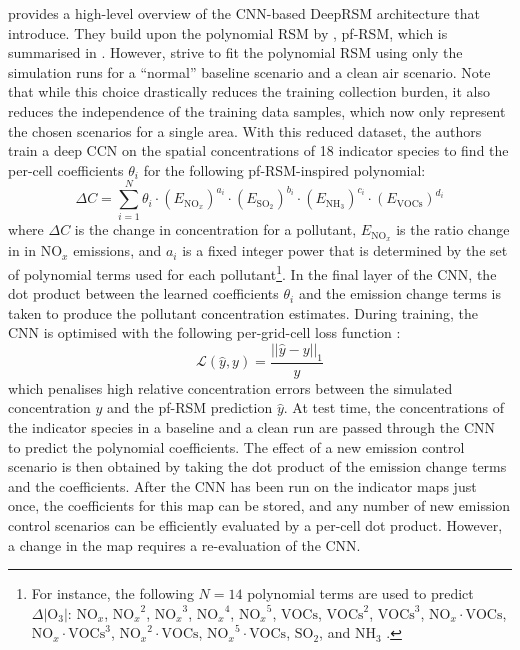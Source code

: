 \newpar {} provides a high-level overview of the CNN-based DeepRSM architecture that \citeauthor{deep-rsm-2020} introduce. They build upon the polynomial RSM by \textcite{pf-rsm-2018}, pf-RSM, which is summarised in . However, \citeauthor{deep-rsm-2020} strive to fit the polynomial RSM using only the simulation runs for a ``normal'' baseline scenario and a clean air scenario. Note that while this choice drastically reduces the training collection burden, it also reduces the independence of the training data samples, which now only represent the chosen scenarios for a single area. With this reduced dataset, the authors train a deep CCN on the spatial concentrations of 18 indicator species to find the per-cell coefficients $\theta_i$ for the following pf-RSM-inspired polynomial:
\begin{equation*}
    \Delta C = \sum_{i=1}^{N} \theta_i \cdot (E_{\text{NO}_{x}})^{a_i} \cdot (E_{\text{SO}_2})^{b_i} \cdot (E_{\text{NH}_3})^{c_i} \cdot (E_{\text{VOCs}})^{d_i}
\end{equation*}
where $\Delta C$ is the change in concentration for a pollutant, $E_{\text{NO}_{x}}$ is the ratio change in in $\text{NO}_{x}$ emissions, and $a_i$ is a fixed integer power that is determined by the set of polynomial terms used for each pollutant\footnote{For instance, the following $N = 14$ polynomial terms are used to predict $\Delta |\text{O}_3|$: $\text{NO}_{x}$, ${\text{NO}_{x}}^2$, ${\text{NO}_{x}}^3$, ${\text{NO}_{x}}^4$, ${\text{NO}_{x}}^5$, $\text{VOCs}$, $\text{VOCs}^2$, $\text{VOCs}^3$, $\text{NO}_{x} \cdot \text{VOCs}$, $\text{NO}_{x} \cdot \text{VOCs}^3$, ${\text{NO}_{x}}^2 \cdot \text{VOCs}$, ${\text{NO}_{x}}^5 \cdot \text{VOCs}$, $\text{SO}_2$, and $\text{NH}_3$ \cite{deep-rsm-2020}.}. In the final layer of the CNN, the dot product between the learned coefficients $\theta_i$ and the emission change terms is taken to produce the pollutant concentration estimates. During training, the CNN is optimised with the following per-grid-cell loss function \cite{deep-rsm-2020}:
\begin{equation*}
    \mathcal{L}(\hat{y}, y) = \frac{||\hat{y} - y||_1}{y}
\end{equation*}
which penalises high relative concentration errors between the simulated concentration $y$ and the pf-RSM prediction $\hat{y}$. At test time, the concentrations of the indicator species in a baseline and a clean run are passed through the CNN to predict the polynomial coefficients. The effect of a new emission control scenario is then obtained by taking the dot product of the emission change terms and the coefficients. After the CNN has been run on the indicator maps just once, the coefficients for this map can be stored, and any number of new emission control scenarios can be efficiently evaluated by a per-cell dot product. However, a change in the map requires a re-evaluation of the CNN.

